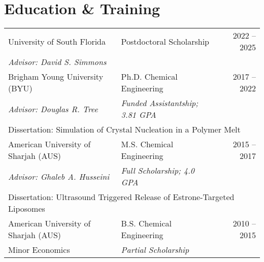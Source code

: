 \documentclass[letterpaper,11pt]{article}
\begin{document}
\section*{Education \& Training}
\begin{tabular}{@{}p{} p{} r@{}}
     University of South Florida                                                                  & Postdoctoral Scholarship                 & 2022 -- 2025 \\
     \multicolumn{1}{l}{\emph{Advisor: David S. Simmons}}                                         & \multicolumn{1}{l}{}                     &              \\ [4pt]

     Brigham Young University (BYU)                                                               & Ph.D. Chemical Engineering               & 2017 -- 2022 \\
     \multicolumn{1}{l}{\emph{Advisor: Douglas R. Tree}}                                          & \emph{Funded Assistantship; 3.81 GPA}    &              \\
     \multicolumn{3}{l}{Dissertation: Simulation of Crystal Nucleation in a Polymer Melt}                                                                   \\ [4pt]

     American University of Sharjah (AUS)                                                         & M.S. Chemical Engineering                & 2015 -- 2017 \\
     \multicolumn{1}{l}{\emph{Advisor: Ghaleb A. Husseini}}                                       & \emph{Full Scholarship; 4.0 GPA}         &              \\
     \multicolumn{3}{l}{Dissertation: Ultrasound Triggered Release of Estrone-Targeted Liposomes}                                                           \\ [4pt]

     American University of Sharjah (AUS)                                                         & B.S. Chemical Engineering                & 2010 -- 2015 \\
     \multicolumn{1}{l}{Minor Economics}                                                          & \emph{Partial Scholarship}               &              \\
\end{tabular}
\end{document}

